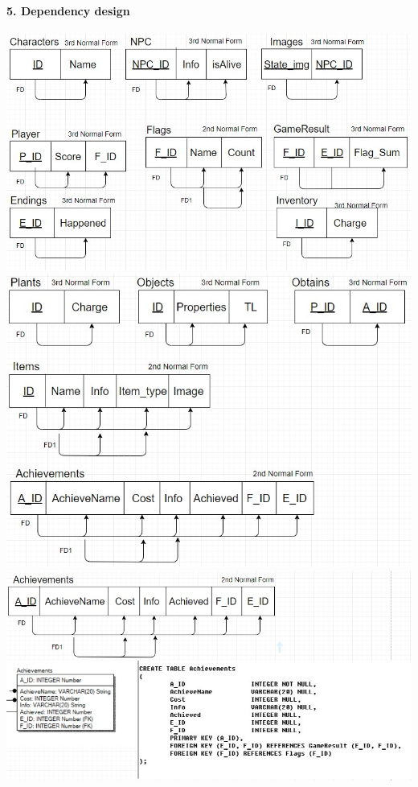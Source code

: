 \documentclass[12pt,a4paper]{article}
\begin{document}
\paragraph{5. Dependency design\\}

\begin{center}
\includegraphics[scale=0.8]{images/FD/FD1.jpg} 
\includegraphics[scale=0.8]{images/FD/FD2.jpg}
\includegraphics[scale=0.8]{images/FD/FD3.jpg}

\end{center}
\end{document}
